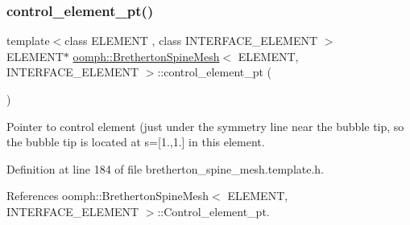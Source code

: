 \subsubsection{\texorpdfstring{control\+\_\+element\+\_\+pt()}{control\_element\_pt()}}
{\footnotesize\ttfamily template$<$class E\+L\+E\+M\+E\+NT , class I\+N\+T\+E\+R\+F\+A\+C\+E\+\_\+\+E\+L\+E\+M\+E\+NT $>$ \\
E\+L\+E\+M\+E\+NT$\ast$ \hyperlink{classoomph_1_1BrethertonSpineMesh}{oomph\+::\+Bretherton\+Spine\+Mesh}$<$ E\+L\+E\+M\+E\+NT, I\+N\+T\+E\+R\+F\+A\+C\+E\+\_\+\+E\+L\+E\+M\+E\+NT $>$\+::control\+\_\+element\+\_\+pt (\begin{DoxyParamCaption}{ }\end{DoxyParamCaption})\hspace{0.3cm}{\ttfamily [inline]}}



Pointer to control element (just under the symmetry line near the bubble tip, so the bubble tip is located at s=\mbox{[}1.,1.\mbox{]} in this element. 



Definition at line 184 of file bretherton\+\_\+spine\+\_\+mesh.\+template.\+h.



References oomph\+::\+Bretherton\+Spine\+Mesh$<$ E\+L\+E\+M\+E\+N\+T, I\+N\+T\+E\+R\+F\+A\+C\+E\+\_\+\+E\+L\+E\+M\+E\+N\+T $>$\+::\+Control\+\_\+element\+\_\+pt.

\mbox{\label{classoomph_1_1BrethertonSpineMesh_ac80488ae4db2da00e1b38f6f07e0ff9d}} 
